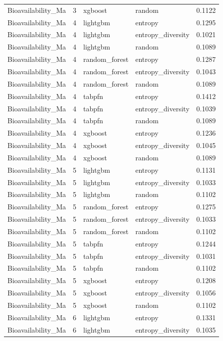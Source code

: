 \begin{tabular}{lrllr}
Bioavailability_Ma & 3 & xgboost & random & 0.1122 \\
Bioavailability_Ma & 4 & lightgbm & entropy & 0.1295 \\
Bioavailability_Ma & 4 & lightgbm & entropy_diversity & 0.1021 \\
Bioavailability_Ma & 4 & lightgbm & random & 0.1089 \\
Bioavailability_Ma & 4 & random_forest & entropy & 0.1287 \\
Bioavailability_Ma & 4 & random_forest & entropy_diversity & 0.1043 \\
Bioavailability_Ma & 4 & random_forest & random & 0.1089 \\
Bioavailability_Ma & 4 & tabpfn & entropy & 0.1412 \\
Bioavailability_Ma & 4 & tabpfn & entropy_diversity & 0.1039 \\
Bioavailability_Ma & 4 & tabpfn & random & 0.1089 \\
Bioavailability_Ma & 4 & xgboost & entropy & 0.1236 \\
Bioavailability_Ma & 4 & xgboost & entropy_diversity & 0.1045 \\
Bioavailability_Ma & 4 & xgboost & random & 0.1089 \\
Bioavailability_Ma & 5 & lightgbm & entropy & 0.1131 \\
Bioavailability_Ma & 5 & lightgbm & entropy_diversity & 0.1033 \\
Bioavailability_Ma & 5 & lightgbm & random & 0.1102 \\
Bioavailability_Ma & 5 & random_forest & entropy & 0.1275 \\
Bioavailability_Ma & 5 & random_forest & entropy_diversity & 0.1033 \\
Bioavailability_Ma & 5 & random_forest & random & 0.1102 \\
Bioavailability_Ma & 5 & tabpfn & entropy & 0.1244 \\
Bioavailability_Ma & 5 & tabpfn & entropy_diversity & 0.1031 \\
Bioavailability_Ma & 5 & tabpfn & random & 0.1102 \\
Bioavailability_Ma & 5 & xgboost & entropy & 0.1208 \\
Bioavailability_Ma & 5 & xgboost & entropy_diversity & 0.1056 \\
Bioavailability_Ma & 5 & xgboost & random & 0.1102 \\
Bioavailability_Ma & 6 & lightgbm & entropy & 0.1331 \\
Bioavailability_Ma & 6 & lightgbm & entropy_diversity & 0.1035 \\

\end{tabular}
